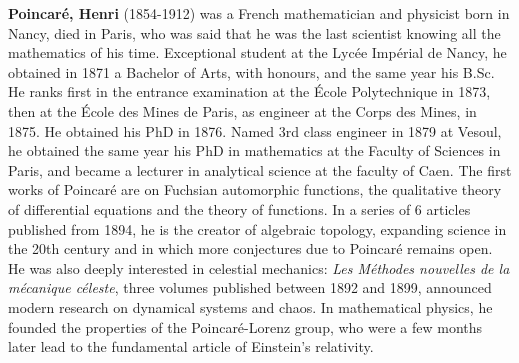 \textbf{Poincaré, Henri} (1854-1912) was a French mathematician and physicist born in Nancy, died in Paris, who was said that he was the last scientist knowing all the mathematics of his time. Exceptional student at the Lycée Impérial de Nancy, he obtained in 1871 a Bachelor of Arts, with honours, and the same year his B.Sc. He ranks first in the entrance examination at the École Polytechnique in 1873, then at the École des Mines de Paris, as engineer at the Corps des Mines, in 1875. He obtained his PhD in 1876. Named 3rd class engineer in 1879 at Vesoul, he obtained the same year his PhD in mathematics at the Faculty of Sciences in Paris, and became a lecturer in analytical science at the faculty of Caen. The first works of Poincaré are on Fuchsian automorphic functions, the qualitative theory of differential equations and the theory of functions. In a series of 6 articles published from 1894, he is the creator of algebraic topology, expanding science in the 20th century and in which more conjectures due to Poincaré remains open. He was also deeply interested in celestial mechanics: \textit{Les Méthodes nouvelles de la mécanique céleste}, three volumes published between 1892 and 1899, announced modern research on dynamical systems and chaos. In mathematical physics, he founded the properties of the Poincaré-Lorenz group, who were a few months later lead to the fundamental article of Einstein's relativity.

